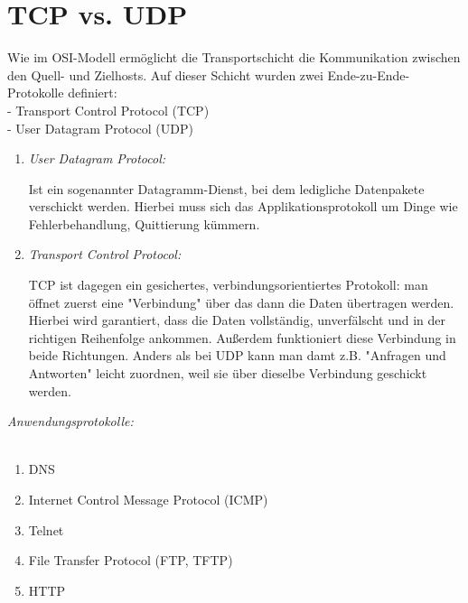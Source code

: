 \documentclass[11pt]{article}
\begin{document}
    \section{TCP vs. UDP}

    Wie im OSI-Modell ermöglicht die Transportschicht die Kommunikation
    zwischen den Quell- und Zielhosts. Auf dieser Schicht wurden zwei
    Ende-zu-Ende-Protokolle definiert:\\

    - Transport Control Protocol (TCP)\\

    - User Datagram Protocol (UDP)\\


    \begin{enumerate}

        \item \emph{User Datagram Protocol:}\\
        \begin{addmargin}[1em]{1em}

            Ist ein sogenannter Datagramm-Dienst, bei dem ledigliche
            Datenpakete verschickt werden. Hierbei muss sich das
            Applikationsprotokoll um Dinge wie Fehlerbehandlung, Quittierung kümmern.

        \end{addmargin}

        \item \emph{Transport Control Protocol:}\\

        \begin{addmargin}[1em]{1em}

            TCP ist dagegen ein gesichertes, verbindungsorientiertes Protokoll:
            man öffnet zuerst eine "Verbindung" über das dann die Daten übertragen
            werden. Hierbei wird garantiert, dass die Daten vollständig, unverfälscht
            und in der richtigen Reihenfolge ankommen.
            Außerdem funktioniert diese Verbindung in beide Richtungen.
            Anders als bei UDP kann man damt z.B. "Anfragen und Antworten" leicht zuordnen,
            weil sie über dieselbe Verbindung geschickt werden.\\

        \end{addmargin}
    \end{enumerate}

    \emph{Anwendungsprotokolle:}\\\\

    \begin{addmargin}[1em]{1em}
        \begin{enumerate}

            \item DNS\\
            \item Internet Control Message Protocol (ICMP)\\
            \item Telnet\\
            \item File Transfer Protocol (FTP, TFTP)\\
            \item HTTP\\

        \end{enumerate}
    \end{addmargin}
\end{document}
